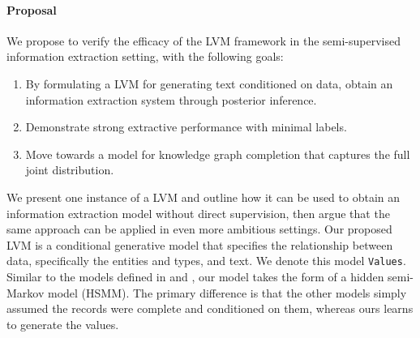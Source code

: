 \documentclass[12pt]{article}
\newcommand{\ba}{\mathbf{a}}
\newcommand{\be}{\mathbf{e}}
\newcommand{\bt}{\mathbf{t}}
\newcommand{\bv}{\mathbf{v}}
\newcommand{\by}{\mathbf{y}}
\begin{document}
\paragraph{Proposal}
We propose to verify the efficacy of the LVM framework in the
semi-supervised information extraction setting,
with the following goals:
\begin{enumerate}
\item By formulating a LVM for generating text conditioned on data,
    obtain an information extraction system through posterior inference.
\item Demonstrate strong extractive performance with minimal labels.
\item Move towards a model for knowledge graph completion that captures
    the full joint distribution.
\end{enumerate}
We present one instance of a LVM and outline how it can be used to obtain
an information extraction model without direct supervision,
then argue that the same approach can be applied in even more ambitious settings.
Our proposed LVM is a conditional generative model that specifies
the relationship between data, specifically the entities and types, and text.
We denote this model \texttt{Values}.
Similar to the models defined in \citet{wiseman2018template} and \citet{liang2009semalign},
our model takes the form of a hidden semi-Markov model (HSMM).
The primary difference is that the other models simply assumed the records
were complete and conditioned on them, whereas ours learns to generate the values.
\end{document}
